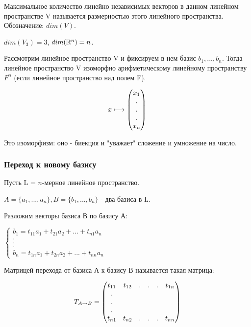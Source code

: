 \documentclass[../main.tex]{subfiles}
\begin{document}
\void{} Максимальное количество линейно независимых векторов в данном линейном
пространстве V называется размерностью этого линейного пространства. Обозначение: $dim(V)$.

\void{} $dim(V_3) = 3$, $dim(\mathbb{R}^n) = n$.

\void{} Рассмотрим линейное пространство V и фиксируем в нем базис $b_1,...,b_n$.
Тогда линейное пространство V изоморфно арифметическому линейному пространству $F^n$
(если линейное пространство над полем F).

$$x \longmapsto \begin{pmatrix} x_1\\.\\.\\.\\x_n\end{pmatrix}$$

Это изоморфизм: оно - биекция и "уважает" сложение и умножение на число.

\subsubsection{Переход к новому базису}

Пусть L = $n$-мерное линейное пространство.

$A = \{a_1,...,a_n\}, B = \{b_1,...,b_n\}$ - два базиса в L.

Разложим векторы базиса В по базису А:

$\left\{ 
    \begin{matrix}
        b_1 = t_{11}a_1 + t_{21}a_2 + ... + t_{n1}a_n\\
        .\\
        .\\
        .\\
        b_n = t_{1n}a_1 + t_{2n}a_2 + ... + t_{nn}a_n
    \end{matrix}
\right.$

\void{} Матрицей перехода от базиса А к базису В называется такая матрица:

$$ T_{A\rightarrow B} = \begin{pmatrix} t_{11} & t_{12} & . & . & . & t_{1n}\\.\\.\\.\\t_{n1} & t_{n2} & . & . & . & t_{nn}\end{pmatrix}$$
\end{document}
